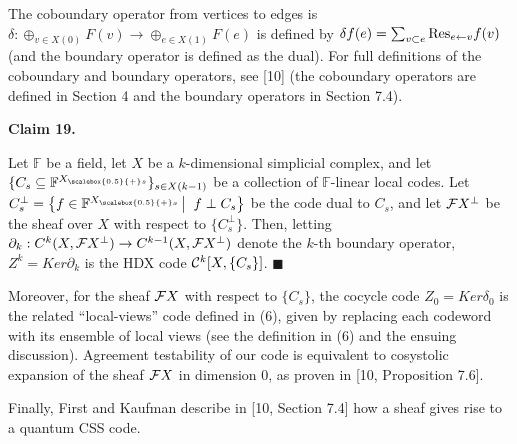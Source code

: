 \documentclass[10pt,a4paper]{article}
\begin{document}



The coboundary operator from vertices to edges is $\delta:\oplus_{v\in X(0)}F(v)\to\oplus_{e\in X(1)}F(e)$ is defined by
$\delta f(e)=\sum_{v\subset e}{\rm Res}_{{e}\leftarrow{v}}f(v)$ (and the boundary operator is defined as the dual).
For full definitions of the coboundary and boundary operators, see [10] (the coboundary operators are defined in Section 4 and the boundary operators in Section 7.4).\par





\par\medskip\noindent\textbf{
Claim 19. 
}\par



Let $\mathbb{F}$ be a field, let $X$ be a $k$-dimensional simplicial complex, and let $\{C_{s}\subseteq\mathbb{F}^{{X}_{\scalebox{0.5}{+}s}}\}_{s\in X(k-1)}$ be a collection of $\mathbb{F}$-linear local codes. Let $C_{s}^{\perp}=\left\{f\in\mathbb{F}^{{X}_{\scalebox{0.5}{+}s}}\left|\;\vphantom{f\in\mathbb{F}^{{X}_{\scalebox{0.5}{+}s}}f\perp C_{s}}\right.f\perp C_{s}\right\}$ be the code dual to $C_{s}$, and let ${\cal F}X^{\perp}$ be the sheaf over $X$ with respect to $\{C_{s}^{\perp}\}$.
Then, letting $\partial_{k}:C^{k}(X,{\cal F}X^{\perp})\to C^{k-1}(X,{\cal F}X^{\perp})$ denote the $k$-th boundary operator, $Z^{k}=Ker\partial_{k}$ is the HDX code ${\cal C}^{k}[X,\{C_{s}\}]$. \ensuremath{\blacksquare}\par






Moreover, for the sheaf ${\cal F}X$ with respect to $\{C_{s}\}$, the cocycle code $Z_{0}=Ker\delta_{0}$ is the related “local-views” code defined in (6), given by replacing each codeword with its ensemble of local views (see the definition in (6) and the ensuing discussion).
Agreement testability of our code is equivalent to cosystolic expansion of the sheaf ${\cal F}X$ in dimension $0$, as proven in [10, Proposition 7.6].\par




Finally, First and Kaufman describe in [10, Section 7.4] how a sheaf gives rise to a quantum CSS code.\par
\end{document}
